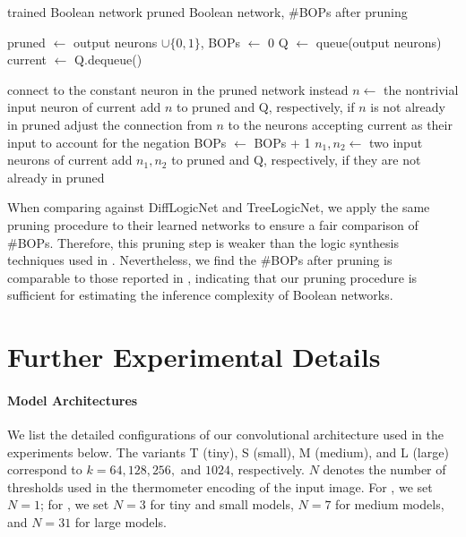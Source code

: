 \begin{algorithm}[tb]
  \caption{Pruning}
  \label{alg:pruning}
  \begin{algorithmic}
     trained Boolean network
     pruned Boolean network, \#BOPs after pruning

    \STATE pruned $\gets$ output neurons $\cup \{0, 1\}$, BOPs $\gets$ 0
    \STATE Q $\gets$ queue(output neurons)
    \REPEAT
      \STATE current $\gets$ Q.dequeue()

        \STATE connect to the constant neuron in the pruned network instead
        \STATE $n \gets$ the nontrivial input neuron of current
        \STATE add $n$ to pruned and Q, respectively, if $n$ is not already in pruned
          \STATE adjust the connection from $n$ to the neurons accepting current as their input to account for the negation
        \ENDIF
      \ELSE
        \STATE BOPs $\gets$ BOPs + 1
        \STATE $n_1, n_2 \gets$ two input neurons of current
        \STATE add $n_1, n_2$ to pruned and Q, respectively, if they are not already in pruned
      \ENDIF

  \end{algorithmic}
\end{algorithm}


When comparing against DiffLogicNet and TreeLogicNet, we apply the same pruning procedure to their learned networks to ensure a fair comparison of \#BOPs. Therefore, this pruning step is weaker than the logic synthesis techniques used in \citet{petersen2022deep,petersen2024convolutional}. Nevertheless, we find the \#BOPs after pruning is comparable to those reported in \citet{petersen2022deep,petersen2024convolutional}, indicating that our pruning procedure is sufficient for estimating the inference complexity of Boolean networks.



\section{Further Experimental Details} \label{app:exp_details}

\paragraph{Model Architectures}

We list the detailed configurations of our convolutional architecture used in the experiments below. The variants T (tiny), S (small), M (medium), and L (large) correspond to $k = 64, 128, 256,$ and $1024$, respectively. $N$ denotes the number of thresholds used in the thermometer encoding of the input image. For \mnist, we set $N=1$; for \cifar, we set $N=3$ for tiny and small models, $N=7$ for medium models, and $N=31$ for large models.

